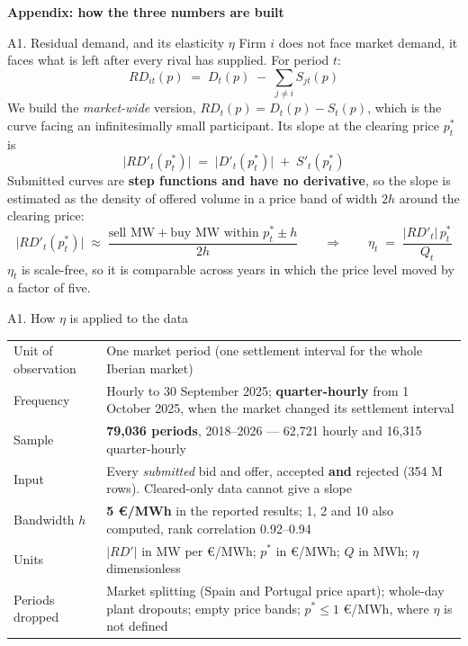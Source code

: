 \documentclass[9pt,aspectratio=169]{beamer}
\makeatletter
\providecommand{\euro}{€}
\newcommand{\designtable}[2]{%
  \small
  \begin{tabularx}{\textwidth}{@{}>{\raggedright\arraybackslash}p{#1}X@{}}
  \toprule
  #2
  \bottomrule
  \end{tabularx}%
}
\makeatother
\begin{document}
\appendix

\begin{frame}[plain]
  \centering\vspace{2em}
  {\Large\bfseries Appendix: how the three numbers are built}
\end{frame}

\begin{frame}{A1. Residual demand, and its elasticity $\eta$}
  \small
  Firm $i$ does not face market demand, it faces what is left after every
  rival has supplied. For period $t$:
  \[
    RD_{it}(p) \;=\; D_t(p) \;-\; \sum_{j \neq i} S_{jt}(p)
  \]
  We build the \emph{market-wide} version, $RD_t(p) = D_t(p) - S_t(p)$, which
  is the curve facing an infinitesimally small participant. Its slope at the
  clearing price $p^*_t$ is
  \[
    \bigl| RD'_t(p^*_t) \bigr| \;=\; \bigl| D'_t(p^*_t) \bigr| \;+\; S'_t(p^*_t)
  \]
  Submitted curves are \textbf{step functions and have no derivative}, so the
  slope is estimated as the density of offered volume in a price band of width
  $2h$ around the clearing price:
  \[
    \bigl| RD'_t(p^*_t) \bigr| \;\approx\;
      \frac{\text{sell MW} + \text{buy MW within } p^*_t \pm h}{2h}
    \qquad\Longrightarrow\qquad
    \eta_t \;=\; \frac{\bigl| RD'_t \bigr| \, p^*_t}{Q_t}
  \]
  $\eta_t$ is scale-free, so it is comparable across years in which the price
  level moved by a factor of five.
\end{frame}

\begin{frame}{A1. How $\eta$ is applied to the data}
  \designtable{}{
    Unit of observation & One market period (one settlement interval for the
    whole Iberian market) \\
    Frequency & Hourly to 30 September 2025; \textbf{quarter-hourly} from
    1 October 2025, when the market changed its settlement interval \\
    Sample & \textbf{79,036 periods}, 2018--2026 --- 62,721 hourly and
    16,315 quarter-hourly \\
    Input & Every \emph{submitted} bid and offer, accepted \textbf{and}
    rejected (354 M rows). Cleared-only data cannot give a slope \\
    Bandwidth $h$ & \textbf{5 \euro/MWh} in the reported results; 1, 2 and 10
    also computed, rank correlation 0.92--0.94 \\
    Units & $|RD'|$ in MW per \euro/MWh; $p^*$ in \euro/MWh; $Q$ in MWh;
    $\eta$ dimensionless \\
    Periods dropped & Market splitting (Spain and Portugal price apart);
    whole-day plant dropouts; empty price bands; $p^* \leq 1$ \euro/MWh,
    where $\eta$ is not defined \\
  }
\end{frame}
\end{document}
